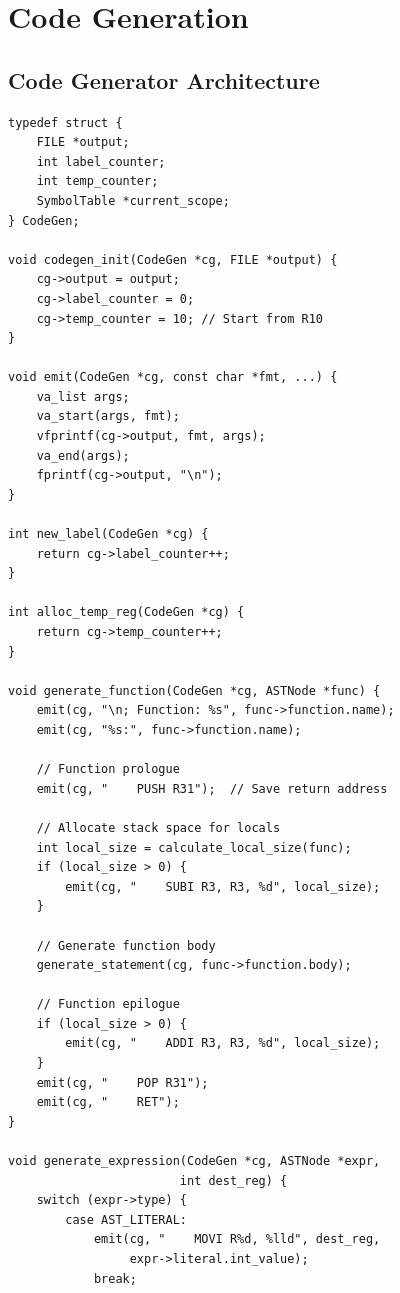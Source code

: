 \documentclass[12pt,a4paper,oneside]{book}
\begin{document}
\chapter{Code Generation}

\section{Code Generator Architecture}

\begin{lstlisting}[style=c, caption={Code Generator}]
typedef struct {
    FILE *output;
    int label_counter;
    int temp_counter;
    SymbolTable *current_scope;
} CodeGen;

void codegen_init(CodeGen *cg, FILE *output) {
    cg->output = output;
    cg->label_counter = 0;
    cg->temp_counter = 10; // Start from R10
}

void emit(CodeGen *cg, const char *fmt, ...) {
    va_list args;
    va_start(args, fmt);
    vfprintf(cg->output, fmt, args);
    va_end(args);
    fprintf(cg->output, "\n");
}

int new_label(CodeGen *cg) {
    return cg->label_counter++;
}

int alloc_temp_reg(CodeGen *cg) {
    return cg->temp_counter++;
}

void generate_function(CodeGen *cg, ASTNode *func) {
    emit(cg, "\n; Function: %s", func->function.name);
    emit(cg, "%s:", func->function.name);
    
    // Function prologue
    emit(cg, "    PUSH R31");  // Save return address
    
    // Allocate stack space for locals
    int local_size = calculate_local_size(func);
    if (local_size > 0) {
        emit(cg, "    SUBI R3, R3, %d", local_size);
    }
    
    // Generate function body
    generate_statement(cg, func->function.body);
    
    // Function epilogue
    if (local_size > 0) {
        emit(cg, "    ADDI R3, R3, %d", local_size);
    }
    emit(cg, "    POP R31");
    emit(cg, "    RET");
}

void generate_expression(CodeGen *cg, ASTNode *expr, 
                        int dest_reg) {
    switch (expr->type) {
        case AST_LITERAL:
            emit(cg, "    MOVI R%d, %lld", dest_reg,
                 expr->literal.int_value);
            break;
            

\end{lstlisting}
\end{document}
